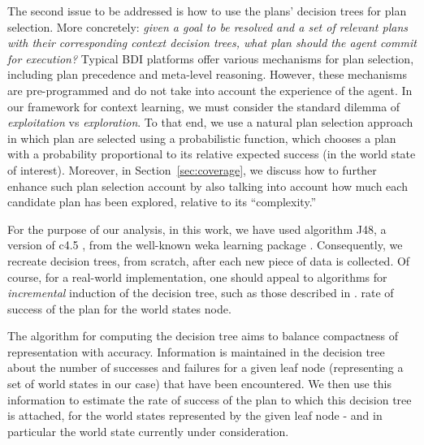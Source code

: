 The second issue to be addressed is how to use the plans' decision trees for plan
selection. More concretely: \emph{given a goal to be resolved and a set of
relevant plans with their corresponding context decision trees, what plan should
the agent commit for execution?}
Typical BDI platforms offer various mechanisms for plan selection, including plan
precedence and meta-level reasoning. However, these mechanisms are pre-programmed
and do not take into account the experience of the agent.
In our framework for context learning, we must consider the standard dilemma of
\emph{exploitation} vs \emph{exploration}. To that end, we use a natural plan
selection approach in which plan are selected using a probabilistic function,
which chooses a plan with a probability proportional to its relative expected
success (in the world state of interest). Moreover, in
Section~\ref{sec:coverage}, we discuss how to further enhance such plan selection
account by also talking into account how much each candidate plan has been
explored, relative to its ``complexity.''



For the purpose of our analysis, in this work, we have used algorithm
\textsf{J48}, a version of \textsf{c4.5} \cite{Mitchell97:ML}, from the
well-known \textsf{weka} learning package \cite{weka99}. Consequently, we
recreate decision trees, from scratch, after each new piece of data is collected.
Of course, for a real-world implementation, one should appeal to algorithms for
\emph{incremental} induction of the decision tree, such as those described in
\cite{Swere06:Fast,Utgoff97Decision}.
rate of success of the plan for the world states
node.
 
%

The algorithm for computing the decision tree aims to balance
compactness of representation with accuracy. Information
is maintained in the decision tree about the number of successes and
failures for a given leaf node (representing a set of world states in
our case) that have been encountered.
We then use this information to estimate the rate of success of the
plan to which this decision tree is attached, for the world states
represented by the given leaf node - and in particular the world state
currently under consideration.

